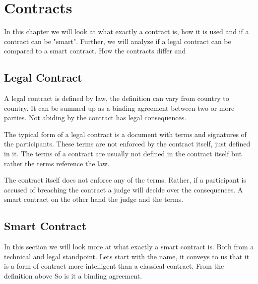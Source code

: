\chapter{Contracts}

In this chapter we will look at what exactly a contract is, how it is used and if a contract can be "smart". Further, we will analyze if a legal contract can be compared to a smart contract. How the contracts differ and

\section{Legal Contract}
A legal contract is defined by law, the definition can vary from country to country. It can be summed up as a binding agreement between two or more parties. Not abiding by the contract has legal consequences.

The typical form of a legal contract is a document with terms and signatures of the participants. These terms are not enforced by the contract itself, just defined in it. The terms of a contract are usually not defined in the contract itself but rather the terms reference the law. 

The contract itself does not enforce any of the terms. Rather, if a participant is accused of breaching the contract a judge will decide over the consequences. A smart contract on the other hand the judge and the terms.

\section{Smart Contract}
In this section we will look more at what exactly a smart contract is. Both from a technical and legal standpoint. Lets start with the name, it conveys to us that it is a form of contract more intelligent than a classical contract. From the definition above So is it a binding agreement.

